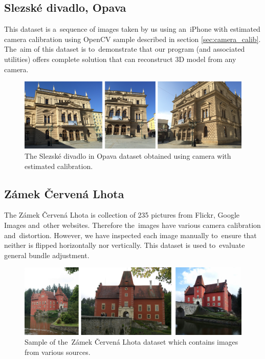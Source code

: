 \subsection*{Slezské divadlo, Opava}
This dataset is a~sequence of images taken by us using an~iPhone with estimated camera calibration using OpenCV sample described in section \ref{sec:camera_calib}. The~aim of this dataset is to~demonstrate that our program (and associated utilities) offers complete solution that can reconstruct 3D model from any camera.

\begin{figure}[ht]
	\begin{center}
		\includegraphics[keepaspectratio,width=\textwidth]{fig/experiments-divadlo.pdf}
	\end{center}
	\caption{The Slezské divadlo in Opava dataset obtained using camera with estimated calibration.}
	\label{fig:divadlo}
\end{figure}

\subsection*{Zámek Červená Lhota}
The Zámek  Červená Lhota is collection of 235 pictures from Flickr, Google Images and~other websites. Therefore the~images have various camera calibration and~distortion. However, we have inspected each image manually to~ensure that neither is flipped horizontally nor vertically. This dataset is used to~evaluate general bundle adjustment.

\begin{figure}[ht]
	\begin{center}
		\includegraphics[keepaspectratio,width=\textwidth]{fig/experiments-cervena-lhota.pdf}
	\end{center}
	\caption{Sample of the~Zámek Červená Lhota dataset which contains images from various sources.}
	\label{fig:cervena-lhota}
\end{figure}

